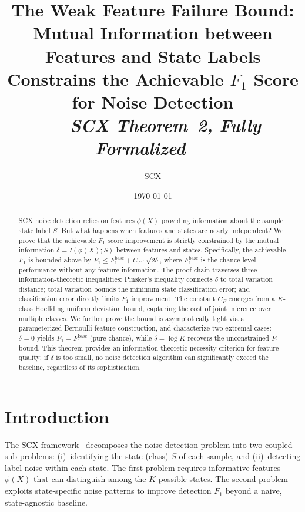 \documentclass[12pt,a4paper]{article}
\title{\bfseries The Weak Feature Failure Bound:\\
Mutual Information between Features and State Labels\\
Constrains the Achievable $F_1$ Score for Noise Detection\\
--- \emph{SCX Theorem~2, Fully Formalized} ---}
\author{SCX}
\date{\today}
\begin{document}
\maketitle

\begin{abstract}
SCX noise detection relies on features $\phi(X)$ providing information about the sample state label $S$. But what happens when features and states are nearly independent? We prove that the achievable $F_1$ score improvement is strictly constrained by the mutual information $\delta = I(\phi(X); S)$ between features and states. Specifically, the achievable $F_1$ is bounded above by $F_1 \leq F_1^{\mathrm{base}} + C_F \cdot \sqrt{2\delta}$, where $F_1^{\mathrm{base}}$ is the chance-level performance without any feature information. The proof chain traverses three information-theoretic inequalities: Pinsker's inequality connects $\delta$ to total variation distance; total variation bounds the minimum state classification error; and classification error directly limits $F_1$ improvement. The constant $C_F$ emerges from a $K$-class Hoeffding uniform deviation bound, capturing the cost of joint inference over multiple classes. We further prove the bound is asymptotically tight via a parameterized Bernoulli-feature construction, and characterize two extremal cases: $\delta=0$ yields $F_1=F_1^{\mathrm{base}}$ (pure chance), while $\delta=\log K$ recovers the unconstrained $F_1$ bound. This theorem provides an information-theoretic necessity criterion for feature quality: if $\delta$ is too small, no noise detection algorithm can significantly exceed the baseline, regardless of its sophistication.
\end{abstract}

\section{Introduction}
\label{sec:intro}

The \textsf{SCX} framework~\citep{scx2024cercis} decomposes the noise detection problem
into two coupled sub-problems: (i)~identifying the state (class) $S$ of each
sample, and (ii)~detecting label noise within each state.  The first problem
requires informative features $\phi(X)$ that can distinguish among the $K$
possible states.  The second problem exploits state-specific noise patterns to
improve detection $F_1$ beyond a naive, state-agnostic baseline.
\end{document}

